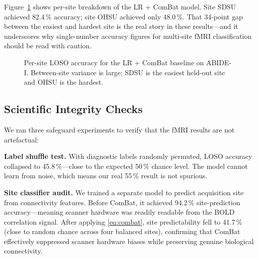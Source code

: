 \documentclass[conference]{IEEEtran}
\begin{document}
Figure~\ref{fig:loso} shows per-site breakdown of the LR + ComBat model.
Site SDSU achieved 82.4\,\% accuracy; site OHSU achieved only 48.0\,\%.
That 34-point gap between the easiest and hardest site is the real
story in these results---and it underscores why single-number accuracy
figures for multi-site fMRI classification should be read with caution.

\begin{figure}[htbp]
\centering
{}
\caption{Per-site LOSO accuracy for the LR + ComBat baseline on ABIDE-I.
Between-site variance is large; SDSU is the easiest held-out site and
OHSU is the hardest.}
\label{fig:loso}
\end{figure}

\subsection{Scientific Integrity Checks}

We ran three safeguard experiments to verify that the fMRI results are
not artefactual:

\textbf{Label shuffle test.} With diagnostic labels randomly permuted,
LOSO accuracy collapsed to 45.8\,\%---close to the expected 50\,\%
chance level. The model cannot learn from noise, which means our real
55\,\% result is not spurious.

\textbf{Site classifier audit.} We trained a separate model to predict
acquisition site from connectivity features. Before ComBat, it achieved
94.2\,\% site-prediction accuracy---meaning scanner hardware was
readily readable from the BOLD correlation signal. After applying \eqref{eq:combat}, site predictability fell
to 41.7\,\% (close to random chance across four balanced sites), confirming that ComBat effectively suppressed scanner hardware biases while preserving genuine biological connectivity.
\end{document}
